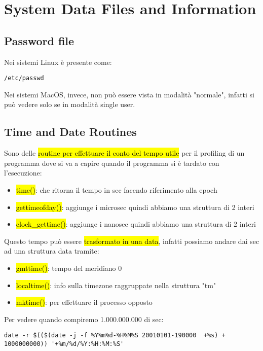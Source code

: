 \newpage
\section{System Data Files and Information}


\subsection{Password file}

Nei sistemi Linux è presente come: 

\begin{lstlisting}
/etc/passwd
\end{lstlisting}

Nei sistemi MacOS, invece, non può essere vista in modalità "normale", infatti si può vedere solo se in modalità single user.


\subsection{Time and Date Routines}

Sono delle \hl{routine per effettuare il conto del tempo utile} per il profiling di un programma dove si va a capire quando il programma si è tardato con l'esecuzione:

\begin{itemize}
    \item \hl{time()}: che ritorna il tempo in sec facendo riferimento alla epoch
    \item \hl{gettimeofday()}: aggiunge i microsec quindi abbiamo una struttura di 2 interi
    \item \hl{clock\_gettime()}: aggiunge i nanosec quindi abbiamo una struttura di 2 interi
\end{itemize}

Questo tempo può essere \hl{trasformato in una data}, infatti possiamo andare dai sec ad una struttura data tramite:

\begin{itemize}
    \item \hl{gmttime()}: tempo del meridiano 0
    \item \hl{localtime()}: info sulla timezone raggruppate nella struttura "tm"
    \item \hl{mktime()}: per effettuare il processo opposto
\end{itemize}  

Per vedere quando compiremo 1.000.000.000 di sec:
\begin{lstlisting}
date -r $(($(date -j -f %Y%m%d-%H%M%S 20010101-190000  +%s) + 1000000000)) '+%m/%d/%Y:%H:%M:%S'
\end{lstlisting}
